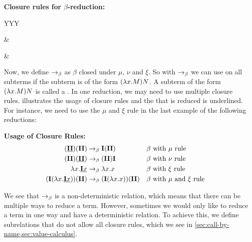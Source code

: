 \begin{definition}
  \label{def:closure-rules}
  \textbf{Closure rules for \boldmath${\beta}$-reduction:} \\
    \begin{tabularx}{\textwidth}{YYY}
      \begin{prooftree}
        \RightLabel{$(\mu)$}
      \end{prooftree}
       & \quad
      \begin{prooftree}
        \RightLabel{$(\nu)$}
      \end{prooftree}
       & \quad
      \begin{prooftree}
        \RightLabel{$(\xi)$}
      \end{prooftree}
    \end{tabularx}
\end{definition}


Now, we define $\to_\beta$ as $\beta$ closed under $\mu$, $\nu$ and $\xi$. 
So with $\to_\beta$ we can use \br on all subterms if the subterm is of the form $(\lambda {x}.{M})N$. A subterm of the form $(\lambda {x}.{M})N$ is called a \bre.
In one reduction, we may need to use multiple closure rules.  illustrates the usage of closure rules and the \bre that is reduced is underlined.
For instance, we need to use the $\mu$ and $\xi$ rule in the last example of the following reductions: 

\begin{example}
  \label{ex:beta-reduction}
  \textbf{Usage of Closure Rules:}
  \begin{align*}
 (\underline{\mathbf{I} \mathbf{I}})(\mathbf{I} \mathbf{I})              &\to_\beta \mathbf{I} (\mathbf{I} \mathbf{I})               & &\beta \text{ with } \mu \text{ rule } \\
 (\mathbf{I} \mathbf{I})(\underline{\mathbf{I} \mathbf{I}})              &\to_\beta (\mathbf{I} \mathbf{I}) \mathbf{I}               & &\beta \text{ with } \nu \text{ rule } \\
 \lambda {x}.{\underline{\mathbf{I} x}}                 &\to_\beta \lambda {x}.{x}                 & &\beta \text{ with } \xi \text{ rule } \\
 (\mathbf{I}(\lambda {x}.{\underline{\mathbf{I} x}}))(\mathbf{I} \mathbf{I}) &\to_\beta (\mathbf{I}(\lambda {x}.{x}))(\mathbf{I} \mathbf{I}) & &\beta \text{ with } \mu \text{ and } \xi \text{ rule } \\
  \end{align*}
\end{example}

We see that $\to_\beta$ is a non-deterministic relation, which means that there can be multiple ways to reduce a term.
However, sometimes we would only like to reduce a term in one way and have a deterministic relation.
To achieve this, we define subrelations that do not allow all closure rules, which we see in \cref{sec:call-by-name,sec:value-calculus}.